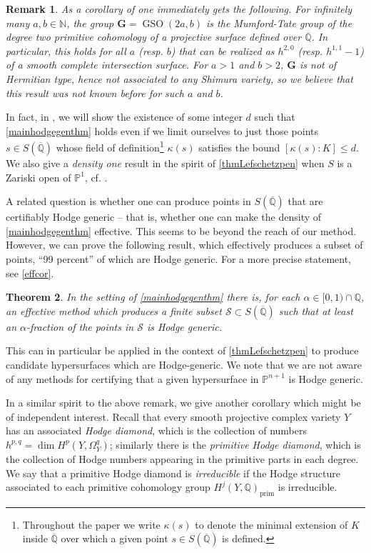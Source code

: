 \documentclass[10pt]{article}
\numberwithin{equation}{section}
\theoremstyle{plain}
\newtheorem{thm}{Theorem}[section]
\newtheorem{rem}[thm]{Remark}
\theoremstyle{definition}
\theoremstyle{remark}
\newcommand{\Qbar}{\overline{\mathbb{Q}}}
\newcommand{\Q}{\mathbb{Q}}
\newcommand{\N}{\mathbb{N}}
\newcommand{\PP}{\mathbb{P}}
\begin{document}
\begin{rem}
As a corollary of  one immediately gets the following. For infinitely many $a,b\in \N$, the group $\mathbf{G}=\operatorname{GSO}(2a,b)$ is the Mumford-Tate group of the degree two primitive cohomology of a projective surface defined over $\Qbar$. In particular, this holds for all $a$ (resp. $b$) that can be realized as $h^{2,0}$ (resp. $h^{1,1}-1$) of a smooth complete intersection surface. For $a>1$ and $b>2$, $\mathbf{G}$ is not of Hermitian type, hence not associated to any Shimura variety, so we believe that this result was not known before for such $a$ and $b$.  
\end{rem}

\noindent In fact, in , we will show the existence of some integer $d$ such that \autoref{mainhodgegenthm} holds even if we limit ourselves to just those points $s \in S(\Qbar)$ whose field of definition\footnote{Throughout the paper we write $\kappa(s)$ to denote the minimal extension of $K$ inside $\Qbar$ over which a given point $s \in S(\Qbar)$ is defined.} $\kappa(s)$ satisfies the bound $[\kappa(s) : K] \leq d$. We also give a \emph{density one} result in the spirit of \autoref{thmLefschetzpen} when $S$ is a Zariski open of $\PP^1$, cf. . 

A related question is whether one can produce points in $S(\Qbar)$ that are certifiably Hodge generic -- that is, whether one can make the density of \autoref{mainhodgegenthm} effective. This seems to be beyond the reach of our method. However, we can prove the following result, which effectively produces a subset of points, ``99 percent'' of which are Hodge generic. For a more precise statement, see \autoref{effcor}. 
\begin{thm}\label{effectivethmintro}
In the setting of \autoref{mainhodgegenthm} there is, for each $\alpha \in [0, 1) \cap \mathbb{Q}$, an effective method which produces a finite subset $\mathcal{S} \subset S(\Qbar)$ such that at least an $\alpha$-fraction of the points in $\mathcal{S}$ is Hodge generic.
\end{thm}
\noindent This can in particular be applied in the context of \autoref{thmLefschetzpen} to produce candidate hypersurfaces which are Hodge-generic. We note that we are not aware of any methods for certifying that a given hypersurface in $\mathbb{P}^{n+1}$ is Hodge generic.


In a similar spirit to the above remark, we give another corollary which might be of independent interest. Recall that every smooth projective complex variety $Y$ has an associated \emph{Hodge diamond}, which is the collection of numbers $h^{p,q}= \dim H^p(Y,\Omega_Y^q)$; similarly there is the \emph{primitive Hodge diamond}, which is the collection of Hodge numbers appearing in the primitive parts in each degree. We say that a primitive Hodge diamond is \emph{irreducible} if the Hodge structure associated to each primitive cohomology group $H^j(Y,\Q)_{\operatorname{prim}}$ is irreducible.
\end{document}
